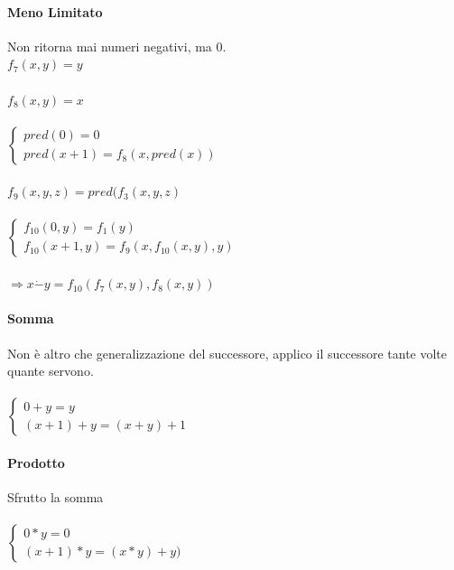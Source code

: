\documentclass[10pt]{book}
\begin{document}
\begin{multicols}{2}
\paragraph{Meno Limitato} Non ritorna mai numeri negativi, ma 0.\\
$f_7(x, y) = y$\\\\
$f_8(x, y) = x$\\\\
\begin{math}
		\left\{
		\begin{array}{l}
			pred(0) = 0\\
			pred(x + 1) = f_8(x, pred(x))
		\end{array}
		\right.
\end{math}\\\\
$f_9(x, y, z) = pred(f_3(x, y, z)$\\\\
\begin{math}
		\left\{
		\begin{array}{l}
			f_{10}(0, y) = f_1(y)\\
			f_{10}(x + 1, y) = f_9(x, f_{10}(x, y), y)
		\end{array}
		\right.
\end{math}\\\\
$\Rightarrow x \dot{-} y = f_{10}(f_7(x, y), f_8(x, y))$
\columnbreak
\paragraph{Somma}
Non è altro che generalizzazione del successore, applico il successore tante volte quante servono.\\\\
\begin{math}
		\left\{
		\begin{array}{l}
			0 + y = y\\
			(x + 1) + y = (x + y) + 1
		\end{array}
		\right.
\end{math}
\paragraph{Prodotto}
Sfrutto la somma\\\\
\begin{math}
		\left\{
		\begin{array}{l}
			0 * y = 0\\
			(x + 1) * y = (x * y) + y)
		\end{array}
		\right.
\end{math}

\end{multicols}
\end{document}
